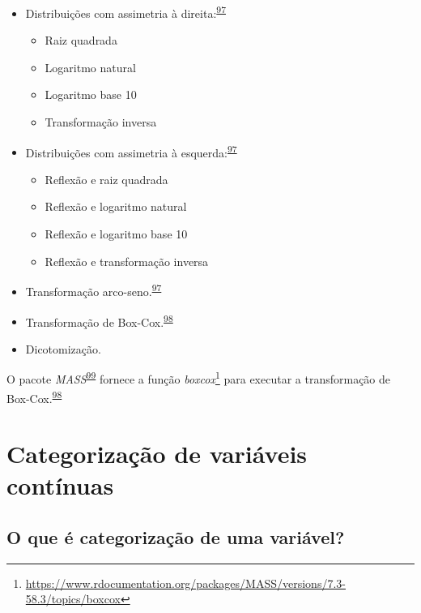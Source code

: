 \documentclass[
  a4paper,
]{book}
\renewcommand{\href}[2]{#2\footnote{\url{#1}}}
\newenvironment{infobox}[1]
  {
  \begin{itemize}
  \renewcommand{\labelitemi}{
    \raisebox{-.7\height}[0pt][0pt]{
      {\setkeys{Gin}{width=3em,keepaspectratio}
        \texttt{[image: \#1]}}
    }
  }
  \setlength{\fboxsep}{1em}
  \begin{blackbox}
  \item
  }
  {
  \end{blackbox}
  \end{itemize}
  }
\begin{document}
\begin{itemize}
\item
  Distribuições com assimetria à direita:\textsuperscript{\protect\hyperlink{ref-osborne2010}{97}}

  \begin{itemize}
  \item
    Raiz quadrada
  \item
    Logaritmo natural
  \item
    Logaritmo base 10
  \item
    Transformação inversa
  \end{itemize}
\item
  Distribuições com assimetria à esquerda:\textsuperscript{\protect\hyperlink{ref-osborne2010}{97}}

  \begin{itemize}
  \item
    Reflexão e raiz quadrada
  \item
    Reflexão e logaritmo natural
  \item
    Reflexão e logaritmo base 10
  \item
    Reflexão e transformação inversa
  \end{itemize}
\item
  Transformação arco-seno.\textsuperscript{\protect\hyperlink{ref-osborne2010}{97}}
\item
  Transformação de Box-Cox.\textsuperscript{\protect\hyperlink{ref-box1964}{98}}
\item
  Dicotomização.
\end{itemize}

\begin{infobox}{images/Rlogo}
O pacote \emph{MASS}\textsuperscript{\protect\hyperlink{ref-MASS}{99}} fornece a função \href{https://www.rdocumentation.org/packages/MASS/versions/7.3-58.3/topics/boxcox}{\emph{boxcox}} para executar a transformação de Box-Cox.\textsuperscript{\protect\hyperlink{ref-box1964}{98}}

\end{infobox}

\hypertarget{categorizacao}{%
\section{Categorização de variáveis contínuas}\label{categorizacao}}

\hypertarget{o-que-uxe9-categorizauxe7uxe3o-de-uma-variuxe1vel}{%
\subsection{O que é categorização de uma variável?}\label{o-que-uxe9-categorizauxe7uxe3o-de-uma-variuxe1vel}}
\end{document}
